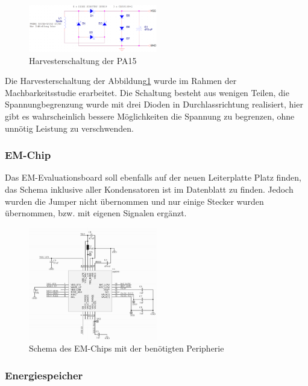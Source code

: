 \begin{figure}[ht]
    \includegraphics[width=0.5\textwidth]{3Vorgehen/imag/Schema_Harvester_PA.png}
    \caption{Harvesterschaltung der PA15}
    \label{schema_harvester_pa15} 
\end{figure}

Die Harvesterschaltung der Abbildung\ref{schema_harvester_pa15} wurde im Rahmen der Machbarkeitsstudie erarbeitet. Die Schaltung besteht aus wenigen Teilen, die Spannungbegrenzung wurde mit drei Dioden in Durchlassrichtung realisiert, hier gibt es wahrscheinlich bessere Möglichkeiten die Spannung zu begrenzen, ohne unnötig Leistung zu verschwenden.

\subsubsection{EM-Chip}

Das EM-Evaluationsboard soll ebenfalls auf der neuen Leiterplatte Platz finden, das Schema inklusive aller Kondensatoren ist im Datenblatt zu finden. Jedoch wurden die Jumper nicht übernommen und nur einige Stecker wurden übernommen, bzw. mit eigenen Signalen ergänzt.

\begin{figure}[ht]
    \includegraphics[width=0.5\textwidth]{3Vorgehen/imag/Schema_EM-Chip_inkl_Peripherie.png}
    \caption{Schema des EM-Chips mit der benötigten Peripherie}\label{schema_em-chip_inkl_peripherie} 
\end{figure}

\subsubsection{Energiespeicher}

